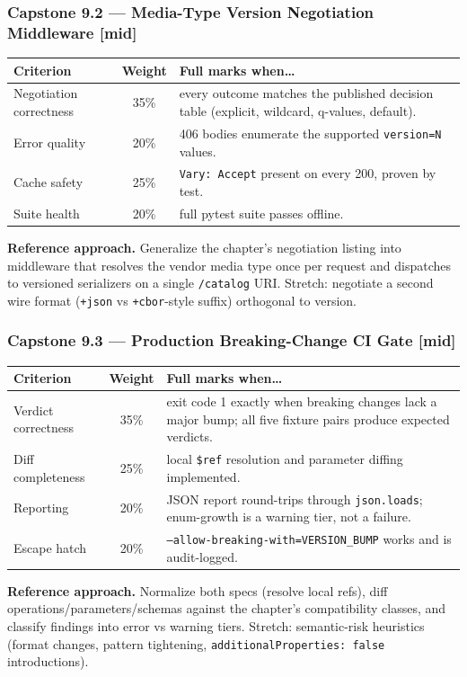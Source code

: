 \subsubsection*{Capstone 9.2 --- Media-Type Version Negotiation Middleware [mid]}
\begin{center}\small
\begin{tabularx}{\textwidth}{l c X}
\toprule
\textbf{Criterion} & \textbf{Weight} & \textbf{Full marks when\ldots} \\
\midrule
Negotiation correctness & 35\% & every outcome matches the published decision table (explicit, wildcard, q-values, default). \\
Error quality & 20\% & 406 bodies enumerate the supported \texttt{version=N} values. \\
Cache safety & 25\% & \texttt{Vary: Accept} present on every 200, proven by test. \\
Suite health & 20\% & full pytest suite passes offline. \\
\bottomrule
\end{tabularx}
\end{center}
\textbf{Reference approach.} Generalize the chapter's negotiation listing
into middleware that resolves the vendor media type once per request and
dispatches to versioned serializers on a single \texttt{/catalog} URI.
Stretch: negotiate a second wire format (\texttt{+json} vs
\texttt{+cbor}-style suffix) orthogonal to version.

\subsubsection*{Capstone 9.3 --- Production Breaking-Change CI Gate [mid]}
\begin{center}\small
\begin{tabularx}{\textwidth}{l c X}
\toprule
\textbf{Criterion} & \textbf{Weight} & \textbf{Full marks when\ldots} \\
\midrule
Verdict correctness & 35\% & exit code 1 exactly when breaking changes lack a major bump; all five fixture pairs produce expected verdicts. \\
Diff completeness & 25\% & local \texttt{\$ref} resolution and parameter diffing implemented. \\
Reporting & 20\% & JSON report round-trips through \texttt{json.loads}; enum-growth is a warning tier, not a failure. \\
Escape hatch & 20\% & \texttt{--allow-breaking-with=VERSION\_BUMP} works and is audit-logged. \\
\bottomrule
\end{tabularx}
\end{center}
\textbf{Reference approach.} Normalize both specs (resolve local refs),
diff operations/parameters/schemas against the chapter's compatibility
classes, and classify findings into error vs warning tiers. Stretch:
semantic-risk heuristics (format changes, pattern tightening,
\texttt{additionalProperties: false} introductions).

